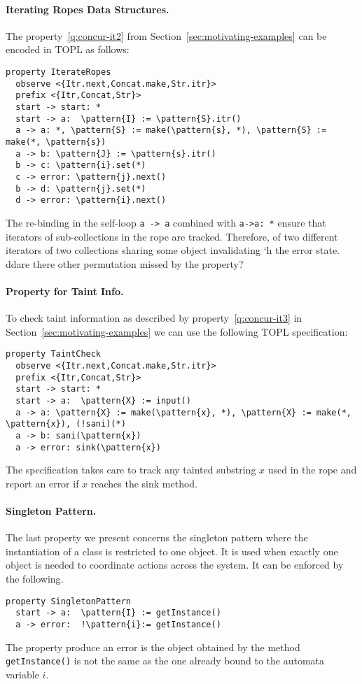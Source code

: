 \documentclass[9pt, preprint]{sigplanconf} %
\newcommand{\noterg}[2]{\textcolor{gray}{[\textcolor{red}{#1}: #2]}}
\newcommand{\dd}[1]{\noterg{dd}{#1}}
\newcommand{\delimitVerbatim}{\par\nobreak\medskip\noindent}
\newcommand{\pattern}[1]{\ensuremath{\mathtt{\underline{#1}}}}
\theoremstyle{definition}
\theoremstyle{remark}
\begin{document}
\paragraph{Iterating Ropes Data Structures.} %
The property~\eqref{q:concur-it2} from Section~\ref{sec:motivating-examples} can be encoded in TOPL as follows:
%
{\small
\delimitVerbatim
\begin{Verbatim}[commandchars=\\\{\}]
property IterateRopes
  observe <{Itr.next,Concat.make,Str.itr}>
  prefix <{Itr,Concat,Str}>
  start -> start: *
  start -> a:  \pattern{I} := \pattern{S}.itr()
  a -> a: *, \pattern{S} := make(\pattern{s}, *), \pattern{S} := make(*, \pattern{s})
  a -> b: \pattern{J} := \pattern{s}.itr()
  b -> c: \pattern{i}.set(*)
  c -> error: \pattern{j}.next()
  b -> d: \pattern{j}.set(*)
  d -> error: \pattern{i}.next()
\end{Verbatim}
\delimitVerbatim}%
The re-binding in the self-loop {\tt a -> a} combined with {\tt a->a: *} ensure that iterators of sub-collections in the rope are tracked. Therefore,
of two different iterators of two collections sharing some object invalidating `h the error state. 
\\dd{are there other permutation missed by the property?}

\paragraph{Property for Taint Info.} %
To check taint information as described by property~\eqref{q:concur-it3} in Section~\ref{sec:motivating-examples} we can use the following
TOPL specification:
{\small
\delimitVerbatim
\begin{Verbatim}[commandchars=\\\{\}]
property TaintCheck
  observe <{Itr.next,Concat.make,Str.itr}>
  prefix <{Itr,Concat,Str}>
  start -> start: *
  start -> a:  \pattern{X} := input()
  a -> a: \pattern{X} := make(\pattern{x}, *), \pattern{X} := make(*, \pattern{x}), (!sani)(*)
  a -> b: sani(\pattern{x})
  a -> error: sink(\pattern{x})
\end{Verbatim}
\delimitVerbatim}%
The specification takes care to track  any tainted substring $x$ used in the rope and report an error if $x$ reaches the sink method.

\paragraph{Singleton Pattern.} 
The last property we present concerns 
the singleton pattern where the instantiation of a class is restricted to one object. It is used when exactly one object is needed to coordinate actions across the system. It can be enforced by the following.
{\small
\delimitVerbatim
\begin{Verbatim}[commandchars=\\\{\}]
property SingletonPattern
  start -> a:  \pattern{I} := getInstance()
  a -> error:  !\pattern{i}:= getInstance()
\end{Verbatim}
\delimitVerbatim}%
The property produce an error is the object obtained by the method {\tt getInstance()} is not the same as the one already bound to the automata variable $i$.
\end{document}
